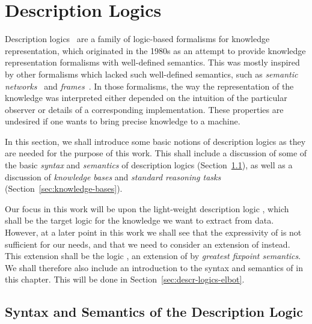 \chapter{Description Logics}
\label{cha:description-logics}

Description logics~\cite{DLhandbook} are a family of logic-based formalisms for knowledge
representation, which originated in the 1980s as an attempt to provide knowledge
representation formalisms with well-defined semantics.  This was mostly inspired by other
formalisms which lacked such well-defined semantics, such as \emph{semantic
  networks}~\cite{SemanticNetworks} and \emph{frames}~\cite{Minsky-Frames}.  In those
formalisms, the way the representation of the knowledge was interpreted either depended on
the intuition of the particular observer or details of a corresponding implementation.
These properties are undesired if one wants to bring precise knowledge to a machine.

In this section, we shall introduce some basic notions of description logics as they are
needed for the purpose of this work.  This shall include a discussion of some of the basic
\emph{syntax} and \emph{semantics} of description logics
(Section~\ref{sec:basic-noti-descr}), as well as a discussion of \emph{knowledge bases}
and \emph{standard reasoning tasks} (Section~\ref{sec:knowledge-bases}).

Our focus in this work will be upon the light-weight description logic \ELbot, which shall
be the target logic for the knowledge we want to extract from data.  However, at a later
point in this work we shall see that the expressivity of \ELbot is not sufficient for our
needs, and that we need to consider an extension of \ELbot instead.  This extension shall
be the logic \ELgfpbot, an extension of \ELbot by \emph{greatest fixpoint semantics}.  We
shall therefore also include an introduction to the syntax and semantics of \ELgfpbot in
this chapter.  This will be done in Section~\ref{sec:descr-logics-elbot}.

\section{Syntax and Semantics of the Description Logic \ELbot}
\label{sec:basic-noti-descr}

